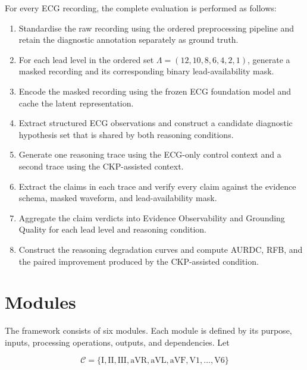 \documentclass{ssnreview}
\begin{document}
For every ECG recording, the complete evaluation is performed as follows:

\begin{enumerate}[label=\textbf{Step \arabic*:},leftmargin=*,align=left]
  \item Standardise the raw recording using the ordered preprocessing pipeline and retain
  the diagnostic annotation separately as ground truth.

  \item For each lead level in the ordered set
  $\Lambda=(12,10,8,6,4,2,1)$, generate a masked recording and its corresponding
  binary lead-availability mask.

  \item Encode the masked recording using the frozen ECG foundation model and cache the
  latent representation.

  \item Extract structured ECG observations and construct a candidate diagnostic
  hypothesis set that is shared by both reasoning conditions.

  \item Generate one reasoning trace using the ECG-only control context and a second trace
  using the CKP-assisted context.

  \item Extract the claims in each trace and verify every claim against the evidence schema,
  masked waveform, and lead-availability mask.

  \item Aggregate the claim verdicts into Evidence Observability and Grounding Quality for
  each lead level and reasoning condition.

  \item Construct the reasoning degradation curves and compute AURDC, RFB, and the paired
  improvement produced by the CKP-assisted condition.
\end{enumerate}

\section{Modules}

The framework consists of six modules. Each module is defined by its purpose, inputs,
processing operations, outputs, and dependencies. Let

\begin{equation}
  \mathcal{C}=\{\mathrm{I},\mathrm{II},\mathrm{III},\mathrm{aVR},
  \mathrm{aVL},\mathrm{aVF},\mathrm{V1},\ldots,\mathrm{V6}\}
\end{equation}
\end{document}
